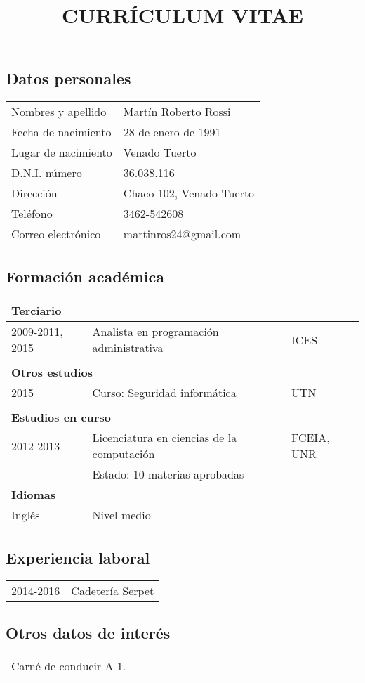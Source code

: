 \documentclass[11pt]{article}
\title{\textbf{CURRÍCULUM VITAE}}
\date{}
\begin{document}
\maketitle
\subsection*{Datos personales}
\bgroup
\def\arraystretch{1.25}
\begin{tabular}{p{6cm} l}
  Nombres y apellido&Martín Roberto Rossi\\
  Fecha de nacimiento&28 de enero de 1991\\
  Lugar de nacimiento&Venado Tuerto\\
  D.N.I. número&36.038.116\\
  Dirección&Chaco 102, Venado Tuerto\\
  Teléfono&3462-542608\\
  Correo electrónico& martinros24@gmail.com\\
\end{tabular}
\subsection*{Formación académica}
{\centering
  \begin{tabular}{|p{4cm}|p{7.5cm}|p{4cm}|}
    \hline
    \multicolumn{3}{|l|}{\textbf{Terciario}}\\ \hline
    2009-2011, 2015&Analista en programación administrativa&ICES\\&&\\ \hline
    \multicolumn{3}{|l|}{\textbf{Otros estudios}}\\ \hline
    2015&Curso: Seguridad informática&UTN\\&&\\ \hline
    \multicolumn{3}{|l|}{\textbf{Estudios en curso}}\\ \hline
    2012-2013&Licenciatura en ciencias de la computación&FCEIA, UNR\\
                   &Estado: 10 materias aprobadas&\\ \hline
    \multicolumn{3}{|l|}{\textbf{Idiomas}}\\ \hline
    Inglés&Nivel medio&\\ \hline
  \end{tabular}
}
\subsection*{Experiencia laboral}
\begin{tabular}{l l}
  2014-2016&Cadetería Serpet\\
\end{tabular}
\newpage
\subsection*{Otros datos de interés}
\begin{tabular}{l}
  Carné de conducir A-1.\\
\end{tabular}
\end{document}
